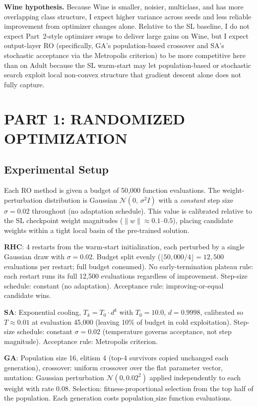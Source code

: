 \documentclass[letterpaper, 10 pt, conference]{ieeeconf}
\begin{document}
\textbf{Wine hypothesis.} Because Wine is smaller, noisier, multiclass, and has more overlapping class structure, I expect higher variance across seeds and less reliable improvement from optimizer changes alone. Relative to the SL baseline, I do not expect Part~2-style optimizer swaps to deliver large gains on Wine, but I expect output-layer RO (specifically, GA's population-based crossover and SA's stochastic acceptance via the Metropolis criterion) to be more competitive here than on Adult because the SL warm-start may let population-based or stochastic search exploit local non-convex structure that gradient descent alone does not fully capture.

\section{PART 1: RANDOMIZED OPTIMIZATION}

\subsection{Experimental Setup}

Each RO method is given a budget of 50{,}000 function evaluations. The weight-perturbation distribution is Gaussian $\mathcal{N}(0,\, \sigma^2 I)$ with a \emph{constant} step size $\sigma = 0.02$ throughout (no adaptation schedule). This value is calibrated relative to the SL checkpoint weight magnitudes ($\|w\| \approx 0.1$--$0.5$), placing candidate weights within a tight local basin of the pre-trained solution.

\textbf{RHC}: 4 restarts from the warm-start initialization, each perturbed by a single Gaussian draw with $\sigma = 0.02$. Budget split evenly ($\lfloor 50{,}000/4 \rfloor = 12{,}500$ evaluations per restart; full budget consumed). No early-termination plateau rule: each restart runs its full 12{,}500 evaluations regardless of improvement. Step-size schedule: constant (no adaptation). Acceptance rule: improving-or-equal candidate wins.

\textbf{SA}: Exponential cooling, $T_k = T_0 \cdot d^k$ with $T_0 = 10.0$, $d = 0.9998$, calibrated so $T \approx 0.01$ at evaluation 45{,}000 (leaving 10\% of budget in cold exploitation). Step-size schedule: constant $\sigma = 0.02$ (temperature governs acceptance, not step magnitude). Acceptance rule: Metropolis criterion.

\textbf{GA}: Population size 16, elitism 4 (top-4 survivors copied unchanged each generation), crossover: uniform crossover over the flat parameter vector, mutation: Gaussian perturbation $\mathcal{N}(0, 0.02^2)$ applied independently to each weight with rate 0.08. Selection: fitness-proportional selection from the top half of the population. Each generation costs $\text{population\_size}$ function evaluations.
\end{document}
